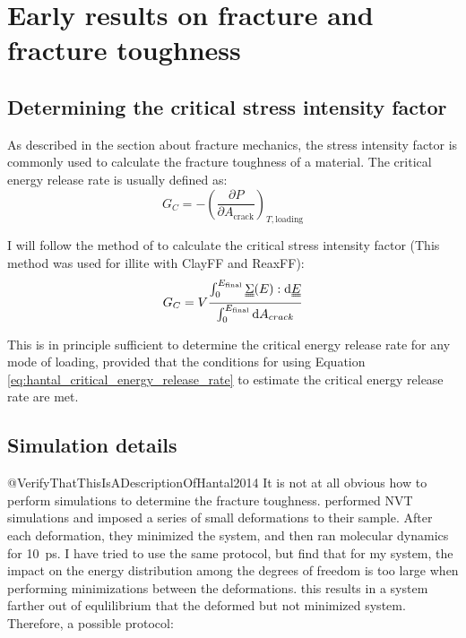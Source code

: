 \section{Early results on fracture and fracture toughness}

\subsection{Determining the critical stress intensity factor}
As described in the section about fracture mechanics, the stress intensity factor is commonly used to calculate the fracture toughness of a material. The critical energy release rate is usually defined as:
\begin{equation}
	G_C = -\left(\frac{\partial P}{\partial A_{\text{crack}}}\right)_{T, \text{loading}}
	\label{eq:def_critical_energy_release_rate}
\end{equation}

I will follow the method of \cite{Hantal2014} to calculate the critical stress intensity factor (This method was used for illite with ClayFF and ReaxFF):\begin{equation}
	G_C = V \frac{\int_0^{E_{\text{final}}}\uuline{\Sigma}(E) : \dd \uuline{E}}{\int_0^{E_{\text{final}}} \dd A_{crack}}
	\label{eq:hantal_critical_energy_release_rate}
\end{equation}

This is in principle sufficient to determine the critical energy release rate for any mode of loading, provided that the conditions for using Equation \ref{eq:hantal_critical_energy_release_rate} to estimate the critical energy release rate are met.

\subsection{Simulation details}
@VerifyThatThisIsADescriptionOfHantal2014
It is not at all obvious how to perform simulations to determine the fracture toughness. \citet{Hantal2014} performed NVT simulations and imposed a series of small deformations to their sample. After each deformation, they minimized the system, and then ran molecular dynamics for \SI{10}{\pico\second}. I have tried to use the same protocol, but find that for my system, the impact on the energy distribution among the degrees of freedom is too large when performing minimizations between the deformations. this results in a system farther out of equlilibrium that the deformed but not minimized system. Therefore, a possible protocol:

